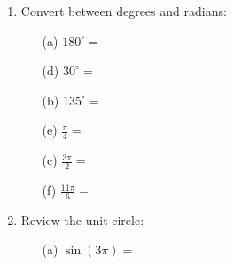 \documentclass[letterpaper,11pt]{article}
\newif\ifsolutions
\begin{document}


\begin{enumerate}
\item  Convert between degrees and radians:
 
 
\begin{changemargin}{0cm}{6.3cm}
\begin{multicols}{3}
\begin{enumerate}

\item[(a)] $180^{\circ}=$ 
\ifsolutions \textcolor{blue}{$\pi$} \fi
\vspace{.25in}

\item[(d)] $30^{\circ}=$ 
\ifsolutions \textcolor{blue}{$\displaystyle \frac{\pi}{6}$} \fi
\vspace{.25in}
 
\item[(b)] $135^{\circ}=$ 
\ifsolutions \textcolor{blue}{$\displaystyle \frac{3\pi}{4}$} \fi
\vspace{.25in}

\item[(e)] $\displaystyle \frac{\pi}{4}=$ 
\ifsolutions \textcolor{blue}{$45^{\circ}$} \fi
\vspace{.25in}

\item[(c)] $\displaystyle \frac{3\pi}{2}=$ 
\ifsolutions \textcolor{blue}{$270^{\circ}$} \fi
\vspace{.25in}

\item[(f)] $\displaystyle \frac{11\pi}{6}=$ 
\ifsolutions \textcolor{blue}{$330^{\circ}$} \fi
\vspace{.25in}

\end{enumerate}
\end{multicols}
\end{changemargin}


\item  Review the unit circle:
\begin{changemargin}{0cm}{0cm}
\begin{multicols}{3}

\begin{enumerate}

\item[(a)] $\displaystyle \sin{(3\pi)}=$ 
\ifsolutions \textcolor{blue}{$0$} \fi
\vspace{.25in}


\end{enumerate}
\end{multicols}
\end{changemargin}
\end{enumerate}
\end{document}
